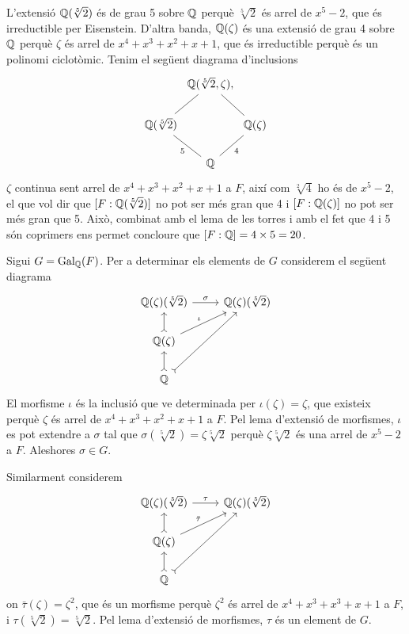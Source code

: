 \documentclass[12pt]{article}
\begin{document}
L'extensió \( \mathbb{Q}(\sqrt[5]{2}) \) és de grau 5 sobre \( \mathbb{Q} \) perquè \( \sqrt[5]{2} \) és
arrel de \( x^5 - 2 \), que és irreductible per Eisenstein. D'altra banda, \( \mathbb{Q}(\zeta) \)
és una extensió de grau 4 sobre \( \mathbb{Q} \) perquè \( \zeta \) és arrel de \( x^4 + x^3 + x^2
+ x + 1 \), que és irreductible perquè és un polinomi ciclotòmic. Tenim el següent
diagrama d'inclusions
\begin{equation*}
	\begin{tikzcd}[column sep = 0.5]
		& \Q(\sqrt[5]{2},\zeta) \arrow[dl, no head], \arrow[dr, no head] & \\
		\Q(\sqrt[5]{2}) & & \Q(\zeta) \\
									 & \Q \arrow[ur, "4", no head, swap] \arrow[ul, "5", no head] & 
	\end{tikzcd}
\end{equation*}
\( \zeta \) continua sent arrel de \( x^4 + x^3 + x^2 + x + 1 \) a \( F \), així
com \( \sqrt[2]{4} \) ho és de \( x^5 - 2 \),  el que vol dir que \(
[F : \mathbb{Q}(\sqrt[5]{2})] \) no pot ser més gran que 4 i \( [F : \mathbb{Q}(\zeta)] \) no pot
ser més gran que 5. Això, combinat amb el lema de les torres i amb el fet que 4 i 5 són
coprimers ens permet concloure que \( [F : \mathbb{Q}] = 4 \times 5 = 20 \).

\parbreak

Sigui \( G = \operatorname{Gal_{\mathbb{Q}}}(F) \). Per a determinar els elements de \( G \) considerem el següent
diagrama
\begin{equation*}
	\begin{tikzcd}
		\Q(\zeta)(\sqrt[5]{2}) \arrow[r, "\sigma"] & \Q(\zeta)(\sqrt[5]{2}) \\
		\Q(\zeta) \arrow[u, tail] \arrow[ur, "\iota"] \\
		\Q \arrow[u, tail] \arrow[uur, tail]
	\end{tikzcd}
\end{equation*}
El morfisme \( \iota \) és la inclusió que ve determinada per \( \iota(\zeta) = \zeta \),
que existeix perquè \( \zeta \) és arrel de \( x^4 + x^3 + x^2 + x + 1 \) a \( F \). Pel
lema d'extensió de morfismes, \( \iota \) es pot extendre a \( \sigma \) tal que \(
\sigma(\sqrt[5]{2}) = \zeta \sqrt[5]{2} \) perquè \( \zeta \sqrt[5]{2} \) és una arrel de
\( x^5 - 2 \) a \( F \). Aleshores \( \sigma \in G \). 

Similarment considerem 
\begin{equation*}
	\begin{tikzcd}
		\Q(\zeta)(\sqrt[5]{2}) \arrow[r, "\tau"] & \Q(\zeta)(\sqrt[5]{2}) \\
		\Q(\zeta) \arrow[u, tail] \arrow[ur, "\bar{\tau}"] \\
		\Q \arrow[u, tail] \arrow[uur, tail]
	\end{tikzcd}
\end{equation*}
on \( \bar{\tau}(\zeta) = \zeta^2 \), que és un morfisme perquè \( \zeta^2 \) és arrel de
\( x^4 + x^3 + x^3 + x + 1 \) a \( F \), i \( \tau(\sqrt[5]{2}) = \sqrt[5]{2} \). Pel lema
d'extensió de morfismes, \( \tau \) és un element de \( G \). 
\end{document}
